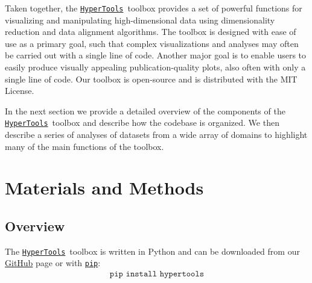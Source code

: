 \documentclass[12pt,letterpaper]{article}
\newcommand{\hypertools}{\href{https://github.com/ContextLab/hypertools}{\texttt{HyperTools}}}
\begin{document}
Taken together, the \hypertools~toolbox provides a set of powerful functions for visualizing and manipulating high-dimensional data using dimensionality reduction and data alignment algorithms.  The toolbox is designed with ease of use as a primary goal, such that complex visualizations and analyses may often be carried out with a single line of code.  Another major goal is to enable users to easily produce visually appealing publication-quality plots, also often with only a single line of code.  Our toolbox is open-source and is distributed with the MIT License.

In the next section we provide a detailed overview of the components of the \hypertools~toolbox and describe how the codebase is organized.  We then describe a series of analyses of datasets from a wide array of domains to highlight many of the main functions of the toolbox.






\section*{Materials and Methods}
\subsection*{Overview}
The \hypertools~toolbox is written in Python and can be downloaded from our \href{https://github.com/ContextLab/hypertools}{GitHub} page or with \href{https://pip.pypa.io/en/stable/installing/}{\texttt{pip}}:
\begin{align}
\texttt{pip install hypertools}
\end{align}
\end{document}
